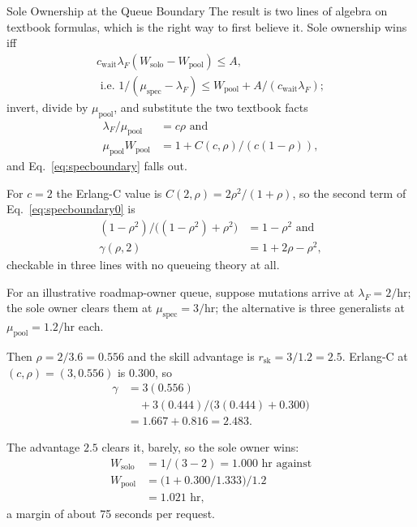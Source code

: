 \documentclass[11pt,a4paper]{article}
\theoremstyle{definition}
\theoremstyle{plain}
\begin{document}
\begin{pdexample}{Sole Ownership at the Queue Boundary}
\setlength{\parskip}{4pt plus 1pt}
\label{ex:queue-boundary}
The result is two lines of algebra on textbook
formulas, which is the right way to first believe it. Sole ownership wins iff
\[
\begin{gathered}
c_{\mathrm{wait}}\lambda_F(W_{\mathrm{solo}}-W_{\mathrm{pool}}) \le A,\\
\text{ i.e.\ }1/(\mu_{\mathrm{spec}}-\lambda_F)
 \le W_{\mathrm{pool}} + A/(c_{\mathrm{wait}}\lambda_F);
\end{gathered}
\]
invert,
divide by $\mu_{\mathrm{pool}}$, and substitute the two textbook facts
\[
\begin{aligned}
\lambda_F/\mu_{\mathrm{pool}} &= c\rho \text{ and}\\
\mu_{\mathrm{pool}}W_{\mathrm{pool}} &= 1 + C(c,\rho)/(c(1-\rho)),
\end{aligned}
\]
and
Eq.~\ref{eq:specboundary} falls out.

For $c=2$ the Erlang-C value is
$C(2,\rho)=2\rho^2/(1+\rho)$, so
the second term of Eq.~\ref{eq:specboundary0} is
\[
\begin{aligned}
(1-\rho^2)/\bigl((1-\rho^2)+\rho^2\bigr) &= 1-\rho^2 \text{ and}\\
\gamma(\rho,2)&=1+2\rho-\rho^2,
\end{aligned}
\]
checkable in three lines with no queueing theory at all.

For an illustrative roadmap-owner queue, suppose mutations arrive at
$\lambda_F = 2/\text{hr}$; the sole owner clears them at
$\mu_{\mathrm{spec}} = 3/\text{hr}$; the alternative is three generalists at
$\mu_{\mathrm{pool}} = 1.2/\text{hr}$ each.

Then $\rho = 2/3.6 = 0.556$ and the
skill advantage is $r_{\mathrm{sk}} = 3/1.2 = 2.5$. Erlang-C at $(c,\rho)=(3,0.556)$ is $0.300$, so
\[
\begin{aligned}
\gamma &= 3(0.556)\\
&\quad{}+ 3(0.444)/\bigl(3(0.444)+0.300\bigr)\\
&= 1.667 + 0.816 = 2.483.
\end{aligned}
\]

The
advantage $2.5$ clears it, barely, so the sole owner wins:
\[
\begin{aligned}
W_{\mathrm{solo}} &= 1/(3-2) = 1.000 \text{ hr against}\\
W_{\mathrm{pool}} &= \bigl(1+0.300/1.333\bigr)/1.2\\
&= 1.021 \text{ hr},
\end{aligned}
\]
a margin of about
75 seconds per request.


\end{pdexample}
\end{document}
